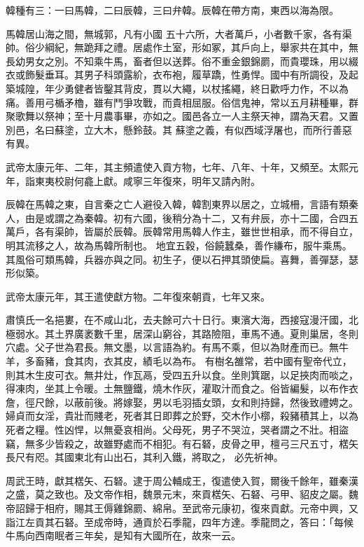 \begin{pinyinscope}
 韓種有三：一曰馬韓，二曰辰韓，三曰弁韓。辰韓在帶方南，東西以海為限。



 馬韓居山海之間，無城郭，凡有小國
 五十六所，大者萬戶，小者數千家，各有渠帥。俗少綱紀，無跪拜之禮。居處作土室，形如冢，其戶向上，舉家共在其中，無長幼男女之別。不知乘牛馬，畜者但以送葬。俗不重金銀錦罽，而貴瓔珠，用以綴衣或飾髮垂耳。其男子科頭露紒，衣布袍，履草蹻，性勇悍。國中有所調役，及起築城隍，年少勇健者皆鑿其背皮，貫以大繩，以杖搖繩，終日歡呼力作，不以為痛。善用弓楯矛櫓，雖有鬥爭攻戰，而貴相屈服。俗信鬼神，常以五月耕種畢，群聚歌舞以祭神；至十月農事畢，亦如之。國邑各立一人主祭天神，謂為天君。又置別邑，名曰蘇塗，立大木，懸鈴鼓。其
 蘇塗之義，有似西域浮屠也，而所行善惡有異。



 武帝太康元年、二年，其主頻遣使入貢方物，七年、八年、十年，又頻至。太熙元年，詣東夷校尉何龕上獻。咸寧三年復來，明年又請內附。



 辰韓在馬韓之東，自言秦之亡人避役入韓，韓割東界以居之，立城柵，言語有類秦人，由是或謂之為秦韓。初有六國，後稍分為十二，又有弁辰，亦十二國，合四五萬戶，各有渠帥，皆屬於辰韓。辰韓常用馬韓人作主，雖世世相承，而不得自立，明其流移之人，故為馬韓所制也。
 地宜五穀，俗饒蠶桑，善作縑布，服牛乘馬。其風俗可類馬韓，兵器亦與之同。初生子，便以石押其頭使扁。喜舞，善彈瑟，瑟形似築。



 武帝太康元年，其王遣使獻方物。二年復來朝貢，七年又來。



 肅慎氏一名挹婁，在不咸山北，去夫餘可六十日行。東濱大海，西接寇漫汗國，北極弱水。其土界廣袤數千里，居深山窮谷，其路險阻，車馬不通。夏則巢居，冬則穴處。父子世為君長。無文墨，以言語為約。有馬不乘，但以為財產而已。無牛羊，多畜豬，食其肉，衣其皮，績毛以為布。
 有樹名雒常，若中國有聖帝代立，則其木生皮可衣。無井灶，作瓦鬲，受四五升以食。坐則箕踞，以足挾肉而啖之，得凍肉，坐其上令暖。土無鹽鐵，燒木作灰，灌取汁而食之。俗皆編髮，以布作衣詹，徑尺餘，以蔽前後。將嫁娶，男以毛羽插女頭，女和則持歸，然後致禮娉之。婦貞而女淫，貴壯而賤老，死者其日即葬之於野，交木作小槨，殺豬積其上，以為死者之糧。性凶悍，以無憂哀相尚。父母死，男子不哭泣，哭者謂之不壯。相盜竊，無多少皆殺之，故雖野處而不相犯。有石砮，皮骨之甲，檀弓三尺五寸，楛矢長尺有咫。其國東北有山出石，其利入鐵，將取之，
 必先祈神。



 周武王時，獻其楛矢、石砮。逮于周公輔成王，復遣使入賀，爾後千餘年，雖秦漢之盛，莫之致也。及文帝作相，魏景元末，來貢楛矢、石砮、弓甲、貂皮之屬。魏帝詔歸于相府，賜其王傉雞錦罽、綿帛。至武帝元康初，復來貢獻。元帝中興，又詣江左貢其石砮。至成帝時，通貢於石季龍，四年方達。季龍問之，答曰：「每候牛馬向西南眠者三年矣，是知有大國所在，故來一云。




\end{pinyinscope}
